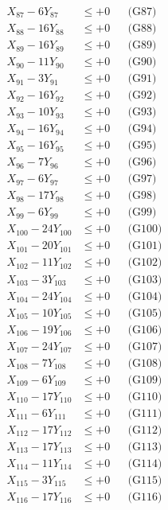 \documentclass[a4paper,10pt]{article}
\begin{document}
{\begin{align}
X_{87} - 6Y_{87} &\leq +0 && \text{(G87)} \\
\allowbreak
X_{88} - 16Y_{88} &\leq +0 && \text{(G88)} \\
X_{89} - 16Y_{89} &\leq +0 && \text{(G89)} \\
X_{90} - 11Y_{90} &\leq +0 && \text{(G90)} \\
X_{91} - 3Y_{91} &\leq +0 && \text{(G91)} \\
X_{92} - 16Y_{92} &\leq +0 && \text{(G92)} \\
X_{93} - 10Y_{93} &\leq +0 && \text{(G93)} \\
X_{94} - 16Y_{94} &\leq +0 && \text{(G94)} \\
X_{95} - 16Y_{95} &\leq +0 && \text{(G95)} \\
X_{96} - 7Y_{96} &\leq +0 && \text{(G96)} \\
X_{97} - 6Y_{97} &\leq +0 && \text{(G97)} \\
\allowbreak
X_{98} - 17Y_{98} &\leq +0 && \text{(G98)} \\
X_{99} - 6Y_{99} &\leq +0 && \text{(G99)} \\
X_{100} - 24Y_{100} &\leq +0 && \text{(G100)} \\
X_{101} - 20Y_{101} &\leq +0 && \text{(G101)} \\
X_{102} - 11Y_{102} &\leq +0 && \text{(G102)} \\
X_{103} - 3Y_{103} &\leq +0 && \text{(G103)} \\
X_{104} - 24Y_{104} &\leq +0 && \text{(G104)} \\
X_{105} - 10Y_{105} &\leq +0 && \text{(G105)} \\
X_{106} - 19Y_{106} &\leq +0 && \text{(G106)} \\
X_{107} - 24Y_{107} &\leq +0 && \text{(G107)} \\
\allowbreak
X_{108} - 7Y_{108} &\leq +0 && \text{(G108)} \\
X_{109} - 6Y_{109} &\leq +0 && \text{(G109)} \\
X_{110} - 17Y_{110} &\leq +0 && \text{(G110)} \\
X_{111} - 6Y_{111} &\leq +0 && \text{(G111)} \\
X_{112} - 17Y_{112} &\leq +0 && \text{(G112)} \\
X_{113} - 17Y_{113} &\leq +0 && \text{(G113)} \\
X_{114} - 11Y_{114} &\leq +0 && \text{(G114)} \\
X_{115} - 3Y_{115} &\leq +0 && \text{(G115)} \\
X_{116} - 17Y_{116} &\leq +0 && \text{(G116)} \\

\end{align}}
\end{document}
